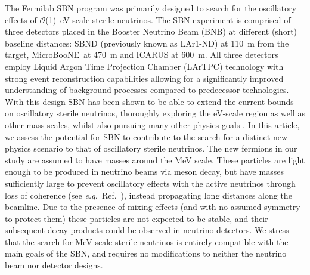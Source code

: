\documentclass[11pt, a4paper]{article}
\newcommand{\refref}[1]{Ref.~\cite{#1}}
\def\eg{\emph{e.g.}}
\def\muboone{MicroBooNE}
\newcounter{CommentCount}
\newcommand{\marcom}[2]{\textsuperscript{\textcolor{#1}{\theCommentCount}}\marginpar{\textsuperscript{\textcolor{#1}{\theCommentCount}}\textcolor{#1}{{\small#1: #2}}}\stepcounter{CommentCount}}
\begin{document}
The Fermilab SBN \cite{Antonello:2015lea} program was primarily designed to
search for the oscillatory effects of $\mathcal{O}$(1)~eV scale sterile
neutrinos.
%
The SBN experiment is comprised of three detectors placed in the Booster
Neutrino Beam (BNB) at different (short) baseline distances: SBND (previously
known as LAr1-ND) at 110~m from the target, \muboone\ at 470~m and ICARUS at
600~m.  All three detectors employ Liquid Argon Time Projection Chamber
(LArTPC) technology \cite{Rubbia:1977} with strong event reconstruction
capabilities allowing for a significantly improved understanding of background
processes compared to predecessor technologies. 
%
With this design SBN has been shown to be able to extend the current bounds on
oscillatory sterile neutrinos, thoroughly exploring the eV-scale region as well
as other mass scales, whilst also pursuing many other physics goals
\cite{Antonello:2015lea}.
%
In this article, we assess the potential for SBN to contribute to the search
for a distinct new physics scenario to that of oscillatory sterile neutrinos.
The new fermions in our study are assumed to have masses around the MeV scale.
These particles are light enough to be produced in neutrino beams via meson
decay, but have masses sufficiently large to prevent oscillatory effects with
the active neutrinos through loss of coherence (see \eg\
\refref{Akhmedov:2009rb}), instead propagating long distances along the
beamline. Due to the presence of mixing effects (and with no assumed symmetry
to protect them) these particles are not expected to be stable, and their
subsequent decay products could be observed in neutrino detectors.
%
%
%
We stress that the search for MeV-scale sterile neutrinos is entirely
compatible with the main goals of the SBN, and requires no modifications to
neither the neutrino beam nor detector designs. 
%
%
\end{document}
